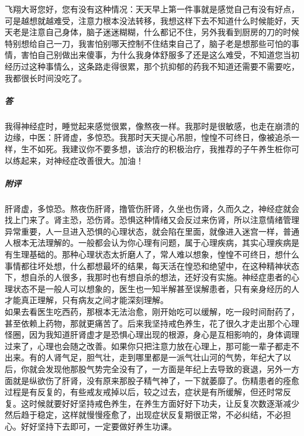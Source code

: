 \begin{case}
    飞翔大哥您好，您有没有这种情况：天天早上第一件事就是感觉自己有没有好点，可是越想就越难受，注意力根本没法转移，我想这样下去不知道什么时候能好，天天老是注意自己身体，脑子迷迷糊糊，什么都记不住，另外我看到厨房的刀的时候特别想给自己一刀，我害怕别哪天控制不住结束自己了，脑子老是想那些可怕的事情，害怕自己别做出来傻事，为什么我身体舒服多了还是这么难受，不知道您当初经历过这种事情么，这条路走得很累，那个抗抑郁的药我不知道还需要不需要吃，我都很长时间没吃了。
    \subparagraph{答} 我得神经症时，睡觉起来感觉很累，像熬夜一样。我那时是很敏感，也走在崩溃的边缘，中医：肝肾虚，多惊恐。我那时天天提心吊胆，惶惶不可终日，像被追杀一样，生不如死。我建议你不要多想，该治疗的积极治疗，我推荐的子午养生桩你可以练起来，对神经症改善很大。加油！
    \subparagraph{附评} 肝肾虚，多惊恐。熬夜伤肝肾，撸管伤肝肾，久坐也伤肾，久而久之，神经症就会找上门来了。肾主恐，恐伤肾。恐惧这种情绪又会反过来伤肾，所以注意情绪管理异常重要，人一旦进入恐惧的心理状态，就会陷在里面，就像进入迷宫一样，普通人根本无法理解的。一般都会认为你心理有问题，属于心理疾病，其实心理疾病是有生理基础的。那种心理状态太折磨人了，常人难以想象，惶惶不可终日，想什么事情都往坏处想，什么都想最坏的结果，每天活在惶恐和绝望中，在这种精神状态下，想自杀的人很多，我那时也有想自杀的想法，还好没有实施。神经症患者的心理状态不是一般人可以想象的，医生也一知半解甚至误解患者，只有亲身经历的人才能真正理解，只有病友之间才能深刻理解。\\
    如果去看医生吃西药，那根本无法治愈，刚开始吃可以缓解，吃一段时间耐药了，甚至依赖上药物，那就更痛苦了。后来我坚持戒色养生，花了很久才走出那个心理怪圈，因为我知道肝肾虚才是恐惧心理出现的根源，身心是互相影响的，身体调理过来了，心理也会随之改善。如果你只把注意力放在心理上，那可能一辈子都走不出来。有的人肾气足，胆气壮，走到哪里都是一派气壮山河的气势，年纪大了以后，你就会发现他那股气势完全没有了，一方面是年纪上去导致的衰退，另外一方面就是纵欲伤了肝肾，没有原来那股子精气神了，一下就萎靡了。伤精患者的痊愈过程是有反复的，有些戒友戒掉以后，较之过去，症状是有所缓解，但还时常反复。这时候就要好好坚持戒色养生，在养生方面好好下功夫，让反复次数逐渐减少然后趋于稳定，这样就慢慢痊愈了，出现症状反复期很正常，不必纠结，不必担心。好好坚持下去即可，一定要做好养生功课。
\end{case}

